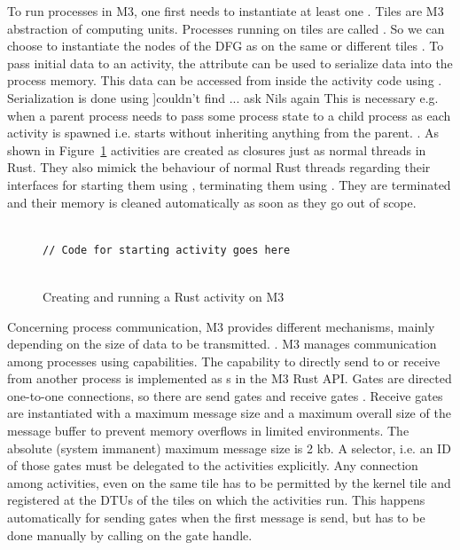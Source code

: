 To run processes in M3, one first needs to instantiate at least one . Tiles are M3 abstraction of computing units. Processes running on tiles are called . So we can choose to instantiate the nodes of the DFG as  on the same or different tiles
. To pass initial data to an activity, the attribute  can be used to serialize data into the process memory. This data can be accessed from inside the activity code using . Serialization is done using  \question]{couldn't find ... ask Nils again}
This is necessary e.g. when a parent process needs to pass some process state to a child process as each activity is spawned i.e. starts without inheriting anything from the parent. . As shown in Figure~\ref{fig:startingActivity} activities are created as closures just as normal threads in Rust. They also mimick the behaviour of normal Rust threads regarding their interfaces for starting them using , terminating them using . They are terminated and their memory is cleaned automatically as soon as they go out of scope.\\ 

\begin{figure}
    \centering
    \begin{verbatim}

// Code for starting activity goes here
    
    \end{verbatim}
    \caption{Creating and running a Rust activity on M3}
    \label{fig:startingActivity}
\end{figure}

Concerning process communication, M3 provides different mechanisms, mainly depending on the size of data to be transmitted. . M3 manages communication among processes using capabilities. The capability to directly send to or receive from another process is implemented as s in the M3 Rust API. Gates are directed one-to-one connections, so there are send gates  and receive gates . Receive gates are instantiated with a maximum message size and a maximum overall size of the message buffer to prevent memory overflows in limited environments. The absolute (system immanent) maximum message size is 2 kb. A selector, i.e. an ID of those gates must be delegated to the activities explicitly. Any connection among activities, even on the same tile has to be permitted by the kernel tile and registered at the DTUs of the tiles on which the activities run. This happens automatically for sending gates when the first message is send, but has to be done manually by calling  on the gate handle. \\

